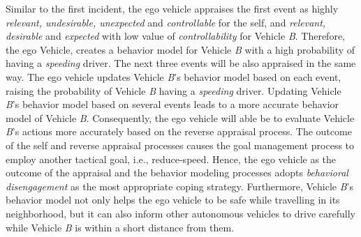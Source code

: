 \documentclass[journal, 11pt]{IEEEtran}
\begin{document}
Similar to the first incident, the ego vehicle appraises the first event as
highly \textit{relevant, undesirable, unexpected} and \textit{controllable} for
the self, and \textit{relevant, desirable} and \textit{expected} with low value
of \textit{controllability} for Vehicle \textit{B}. Therefore, the ego Vehicle,
creates a behavior model for Vehicle \textit{B} with a high probability of
having a \textit{speeding} driver. The next three events will be also appraised
in the same way. The ego vehicle updates Vehicle \textit{B}'s behavior model
based on each event, raising the probability of Vehicle \textit{B} having a
\textit{speeding} driver. Updating Vehicle \textit{B}'s behavior model based on
several events leads to a more accurate behavior model of Vehicle \textit{B}.
Consequently, the ego vehicle will able be to evaluate Vehicle \textit{B}'s
actions more accurately based on the reverse appraisal process. The outcome of
the self and reverse appraisal processes causes the goal management process to
employ another tactical goal, i.e., reduce-speed. Hence, the ego vehicle as the
outcome of the appraisal and the behavior modeling processes adopts
\textit{behavioral disengagement} as the most appropriate coping strategy.
Furthermore, Vehicle \textit{B}'s behavior model not only helps the ego vehicle
to be safe while travelling in its neighborhood, but it can also inform other
autonomous vehicles to drive carefully while Vehicle \textit{B} is within a
short distance from them.
\end{document}
